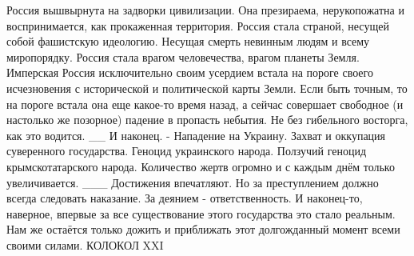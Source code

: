 Россия вышвырнута на задворки цивилизации.
Она презираема, нерукопожатна и воспринимается, как прокаженная территория.
Россия стала страной, несущей собой фашистскую идеологию. Несущая смерть невинным людям и всему миропорядку.
Россия стала врагом человечества, врагом планеты Земля.
Имперская Россия исключительно своим усердием встала на пороге своего исчезновения с исторической и политической карты Земли. Если быть точным, то на пороге встала она еще какое-то время назад, а сейчас совершает свободное (и настолько же позорное) падение в пропасть небытия. Не без гибельного восторга, как это водится.
__
И наконец.
- Нападение на Украину. Захват и оккупация суверенного государства. Геноцид украинского народа. Ползучий геноцид крымскотатарского народа. Количество жертв огромно и с каждым днём только увеличивается.
___
Достижения впечатляют.
Но за преступлением должно всегда следовать наказание.
За деянием - ответственность.
И наконец-то, наверное, впервые за все существование этого государства это стало реальным.
Нам же остаётся только дожить и приближать этот долгожданный момент всеми своими силами.
КОЛОКОЛ XXI

